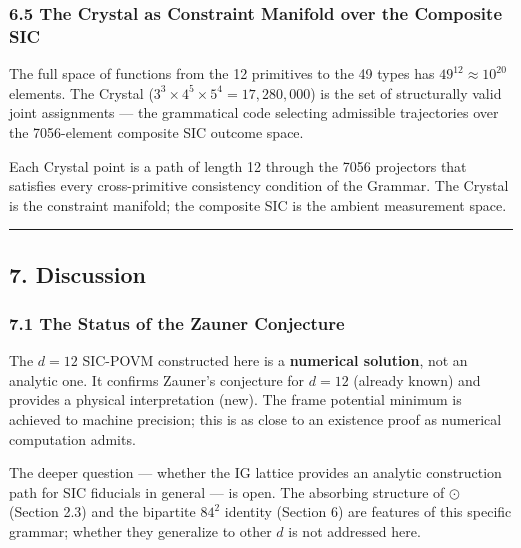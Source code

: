 \hypertarget{the-crystal-as-constraint-manifold-over-the-composite-sic}{%
\subsubsection{6.5 The Crystal as Constraint Manifold over the Composite
SIC}\label{the-crystal-as-constraint-manifold-over-the-composite-sic}}

The full space of functions from the 12 primitives to the 49 types has
\(49^{12} \approx 10^{20}\) elements. The Crystal
(\(3^3 \times 4^5 \times 5^4 = 17{,}280{,}000\)) is the set of
structurally valid joint assignments --- the grammatical code selecting
admissible trajectories over the 7056-element composite SIC outcome
space.

Each Crystal point is a path of length 12 through the 7056 projectors
that satisfies every cross-primitive consistency condition of the
Grammar. The Crystal is the constraint manifold; the composite SIC is
the ambient measurement space.

\begin{center}\rule{0.5\linewidth}{0.5pt}\end{center}

\hypertarget{discussion}{%
\subsection{7. Discussion}\label{discussion}}

\hypertarget{the-status-of-the-zauner-conjecture}{%
\subsubsection{7.1 The Status of the Zauner
Conjecture}\label{the-status-of-the-zauner-conjecture}}

The \(d=12\) SIC-POVM constructed here is a \textbf{numerical solution},
not an analytic one. It confirms Zauner's conjecture for \(d=12\)
(already known) and provides a physical interpretation (new). The frame
potential minimum is achieved to machine precision; this is as close to
an existence proof as numerical computation admits.

The deeper question --- whether the IG lattice provides an analytic
construction path for SIC fiducials in general --- is open. The
absorbing structure of \(\odot\) (Section 2.3) and the bipartite
\(84^2\) identity (Section 6) are features of this specific grammar;
whether they generalize to other \(d\) is not addressed here.

